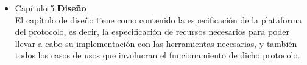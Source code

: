\begin{itemize}
\item Capítulo 5 \textbf{Diseño} \\
El capítulo de diseño tiene como contenido la especificación de la plataforma del protocolo, es decir, la especificación de recursos necesarios para poder llevar a cabo su implementación con las herramientas necesarias, y también todos los casos de usos que involucran el funcionamiento de dicho protocolo.

\end{itemize}





